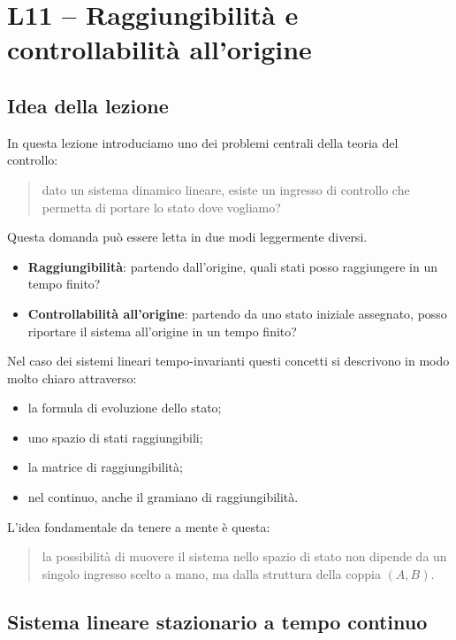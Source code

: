 \chapter{L11 -- Raggiungibilità e controllabilità all'origine}

\section{Idea della lezione}

In questa lezione introduciamo uno dei problemi centrali della teoria del controllo:

\begin{quote}
dato un sistema dinamico lineare, esiste un ingresso di controllo che permetta di portare lo stato dove vogliamo?
\end{quote}

Questa domanda può essere letta in due modi leggermente diversi.

\begin{itemize}
    \item \textbf{Raggiungibilità}: partendo dall'origine, quali stati posso raggiungere in un tempo finito?
    \item \textbf{Controllabilità all'origine}: partendo da uno stato iniziale assegnato, posso riportare il sistema all'origine in un tempo finito?
\end{itemize}

Nel caso dei sistemi lineari tempo-invarianti questi concetti si descrivono in modo molto chiaro attraverso:
\begin{itemize}
    \item la formula di evoluzione dello stato;
    \item uno spazio di stati raggiungibili;
    \item la matrice di raggiungibilità;
    \item nel continuo, anche il gramiano di raggiungibilità.
\end{itemize}

L’idea fondamentale da tenere a mente è questa:

\begin{quote}
la possibilità di muovere il sistema nello spazio di stato non dipende da un singolo ingresso scelto a mano, ma dalla struttura della coppia \((A,B)\).
\end{quote}

\section{Sistema lineare stazionario a tempo continuo}

